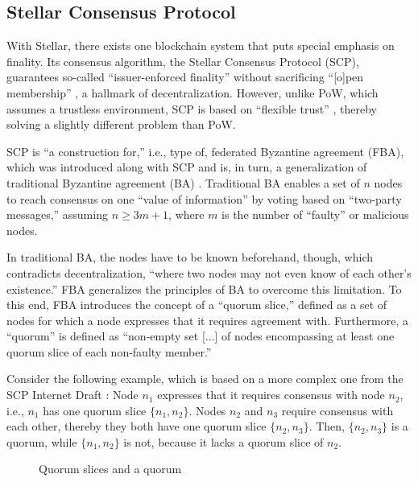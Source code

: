 \subsection{Stellar Consensus Protocol}

With Stellar, there exists one blockchain system that puts special emphasis on finality.
Its consensus algorithm, the Stellar Consensus Protocol (SCP), guarantees so-called ``issuer-enforced finality'' without sacrificing  ``[o]pen membership'' \autocite[1]{lokhava2019}, a hallmark of decentralization.
However, unlike PoW, which assumes a trustless environment, SCP is based on ``flexible trust'' \autocite[2]{mazieres2016}, thereby solving a slightly different problem than PoW.

SCP is ``a construction for,'' i.e., type of, federated Byzantine agreement (FBA), \autocite[2]{mazieres2016} which was introduced along with SCP and is, in turn, a generalization of traditional Byzantine agreement (BA) \autocite[5]{mazieres2016}.
Traditional BA enables a set of $n$ nodes to reach consensus on one ``value of information'' by voting based on ``two-party messages,'' assuming $n \geq 3m + 1$, where $m$ is the number of ``faulty'' or malicious nodes. \autocite{lamport1980}

In traditional BA, the nodes have to be known beforehand, though, which contradicts decentralization, ``where two nodes may not even know of each other’s existence.'' \autocite[4]{lokhava2019}
FBA generalizes the principles of BA to overcome this limitation.
To this end, FBA introduces the concept of a ``quorum slice,'' defined as  a set of nodes for which a node expresses that it requires agreement with. \autocite[4]{lokhava2019}
Furthermore, a ``quorum'' is defined as ``non-empty set [...] of nodes encompassing at least one quorum slice of each non-faulty member.'' \autocite[4]{lokhava2019}

Consider the following example, which is based on a more complex one from the SCP Internet Draft \autocite{ietf2018scp}:
Node $n_1$ expresses that it requires consensus with node $n_2$, i.e., $n_1$ has one quorum slice $\{n_1, n_2\}$.
Nodes $n_2$ and $n_3$ require consensus with each other, thereby they both have one quorum slice $\{n_2, n_3\}$.
Then, $\{n_2, n_3\}$ is a quorum, while $\{n_1, n_2\}$ is not, because it lacks a quorum slice of $n_2$.
\\
\begin{figure}[H]
\centering

\caption*{Quorum slices and a quorum}
\end{figure}

